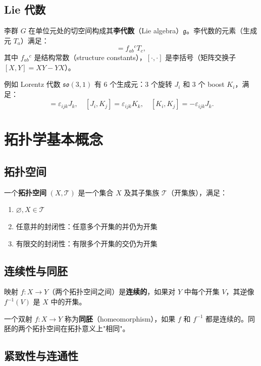 \subsection{Lie 代数}

李群 $G$ 在单位元处的切空间构成其\textbf{李代数}（Lie algebra）$\mathfrak{g}$。李代数的元素（生成元 $T_a$）满足：
\begin{equation}
    [T_a, T_b] = f_{ab}{}^c T_c,
\end{equation}
其中 $f_{ab}{}^c$ 是结构常数（structure constants），$[\cdot,\cdot]$ 是李括号（矩阵交换子 $[X,Y] = XY - YX$）。

例如 Lorentz 代数 $\mathfrak{so}(3,1)$ 有 6 个生成元：3 个旋转 $J_i$ 和 3 个 boost $K_i$，满足：
\begin{equation}
    [J_i, J_j] = \varepsilon_{ijk} J_k, \quad [J_i, K_j] = \varepsilon_{ijk} K_k, \quad [K_i, K_j] = -\varepsilon_{ijk} J_k.
\end{equation}

\section{拓扑学基本概念}

\subsection{拓扑空间}

一个\textbf{拓扑空间} $(X, \mathcal{T})$ 是一个集合 $X$ 及其子集族 $\mathcal{T}$（开集族），满足：
\begin{enumerate}
    \item[(O1)] $\varnothing, X \in \mathcal{T}$
    \item[(O2)] 任意并的封闭性：任意多个开集的并仍为开集
    \item[(O3)] 有限交的封闭性：有限多个开集的交仍为开集
\end{enumerate}

\subsection{连续性与同胚}

映射 $f: X \to Y$（两个拓扑空间之间）是\textbf{连续的}，如果对 $Y$ 中每个开集 $V$，其逆像 $f^{-1}(V)$ 是 $X$ 中的开集。

一个双射 $f: X \to Y$ 称为\textbf{同胚}（homeomorphism），如果 $f$ 和 $f^{-1}$ 都是连续的。同胚的两个拓扑空间在拓扑意义上"相同"。

\subsection{紧致性与连通性}

